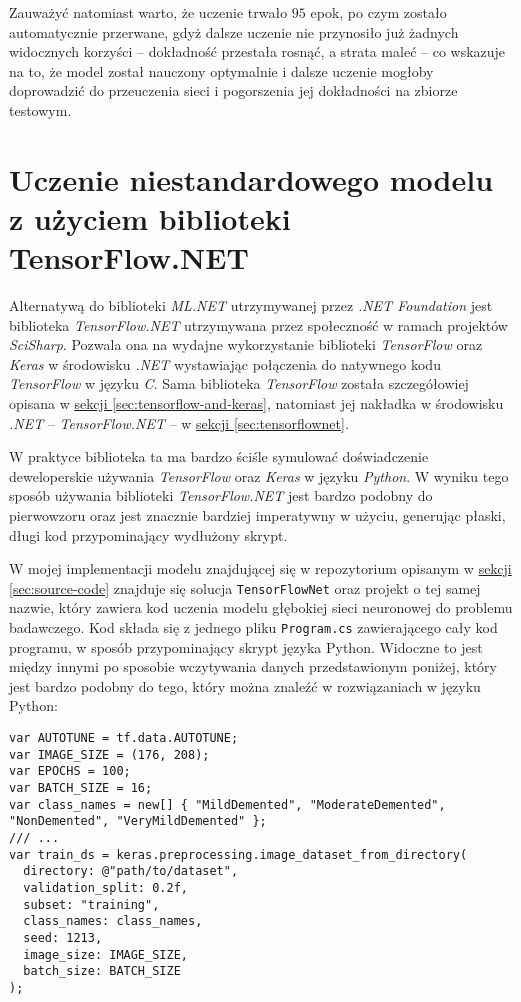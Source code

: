 Zauważyć natomiast warto, że uczenie trwało $95$ epok, po czym zostało automatycznie przerwane, gdyż dalsze uczenie nie przynosiło już żadnych widocznych korzyści -- dokładność przestała rosnąć, a strata maleć -- co wskazuje na to, że model został nauczony optymalnie i dalsze uczenie mogłoby doprowadzić do przeuczenia sieci i pogorszenia jej dokładności na zbiorze testowym.

\section{Uczenie niestandardowego modelu z użyciem biblioteki TensorFlow.NET}

Alternatywą do biblioteki \emph{ML.NET} utrzymywanej przez \emph{.NET Foundation} jest biblioteka \emph{TensorFlow.NET} utrzymywana przez społeczność w ramach projektów \emph{SciSharp}.
Pozwala ona na wydajne wykorzystanie biblioteki \emph{TensorFlow} oraz \emph{Keras} w środowisku \emph{.NET} wystawiając połączenia do natywnego kodu \emph{TensorFlow} w języku \emph{C}.
Sama biblioteka \emph{TensorFlow} została szczegółowiej opisana w \hyperref[sec:tensorflow-and-keras]{sekcji \ref*{sec:tensorflow-and-keras}}, natomiast jej nakładka w środowisku \emph{.NET} -- \emph{TensorFlow.NET} -- w \hyperref[sec:tensorflownet]{sekcji \ref*{sec:tensorflownet}}.

W praktyce biblioteka ta ma bardzo ściśle symulować doświadczenie deweloperskie używania \emph{TensorFlow} oraz \emph{Keras} w języku \emph{Python}.
W wyniku tego sposób używania biblioteki \emph{TensorFlow.NET} jest bardzo podobny do pierwowzoru oraz jest znacznie bardziej imperatywny w użyciu, generując płaski, długi kod przypominający wydłużony skrypt.

W mojej implementacji modelu znajdującej się w repozytorium opisanym w \hyperref[sec:source-code]{sekcji \ref*{sec:source-code}} znajduje się solucja \lstinline{TensorFlowNet} oraz projekt o tej samej nazwie, który zawiera kod uczenia modelu głębokiej sieci neuronowej do problemu badawczego.
Kod składa się z jednego pliku \lstinline{Program.cs} zawierającego cały kod programu, w sposób przypominający skrypt języka Python.
Widoczne to jest między innymi po sposobie wczytywania danych przedstawionym poniżej, który jest bardzo podobny do tego, który można znaleźć w rozwiązaniach w języku Python:

\begin{lstlisting}[language={[Sharp]C}]
var AUTOTUNE = tf.data.AUTOTUNE;
var IMAGE_SIZE = (176, 208);
var EPOCHS = 100;
var BATCH_SIZE = 16;
var class_names = new[] { "MildDemented", "ModerateDemented", "NonDemented", "VeryMildDemented" };
/// ...
var train_ds = keras.preprocessing.image_dataset_from_directory(
  directory: @"path/to/dataset",
  validation_split: 0.2f,
  subset: "training",
  class_names: class_names,
  seed: 1213,
  image_size: IMAGE_SIZE,
  batch_size: BATCH_SIZE
);
\end{lstlisting}

